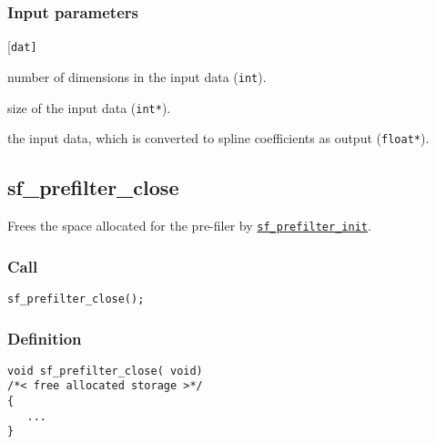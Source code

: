 \subsubsection*{Input parameters}
\begin{desclist}{\tt }{\quad}[\tt dat]
   \setlength\itemsep{0pt}
   \item[dim] number of dimensions in the input data (\texttt{int}). 
   \item[n] size of the input data (\texttt{int*}).  
   \item[dat] the input data, which is converted to spline coefficients as output (\texttt{float*}).  
\end{desclist}




\subsection{{sf\_prefilter\_close}}
Frees the space allocated for the pre-filer by \hyperref[sec:sf_prefilter_init]{\texttt{sf\_prefilter\_init}}.

\subsubsection*{Call}
\begin{verbatim}sf_prefilter_close();\end{verbatim}

\subsubsection*{Definition}
\begin{verbatim}
void sf_prefilter_close( void)
/*< free allocated storage >*/
{
   ...
}
\end{verbatim}
      




